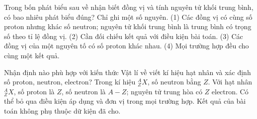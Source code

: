 \begin{ex}
Trong bốn phát biểu sau về nhận biết đồng vị và tính nguyên tử khối trung bình, có bao nhiêu phát biểu đúng? Chỉ ghi một số nguyên. (1) Các đồng vị có cùng số proton nhưng khác số neutron; nguyên tử khối trung bình là trung bình có trọng số theo tỉ lệ đồng vị. (2) Cần đối chiếu kết quả với điều kiện bài toán. (3) Các đồng vị của một nguyên tố có số proton khác nhau. (4) Mọi trường hợp đều cho cùng một kết quả.
\end{ex}

\begin{ex}
Nhận định nào phù hợp với kiến thức Vật lí về viết kí hiệu hạt nhân và xác định số proton, neutron, electron?
\choice
{Trong kí hiệu $^{A}_{Z}X$, số neutron bằng $Z$.}
{\True Với hạt nhân $^{A}_{Z}X$, số proton là $Z$, số neutron là $A-Z$; nguyên tử trung hòa có $Z$ electron.}
{Có thể bỏ qua điều kiện áp dụng và đơn vị trong mọi trường hợp.}
{Kết quả của bài toán không phụ thuộc dữ kiện đã cho.}
\end{ex}

